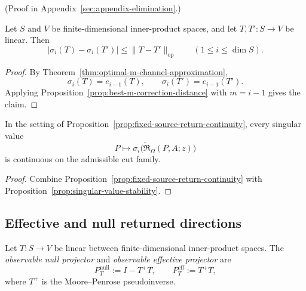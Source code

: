 (Proof in Appendix~\ref{sec:appendix-elimination}.)

\begin{proposition}
\label{prop:singular-value-stability}
Let \(S\) and \(V\) be finite-dimensional inner-product spaces, and let
\(T,T':S\to V\) be linear. Then
\[
\bigl|\sigma_i(T)-\sigma_i(T')\bigr|
\le
\|T-T'\|_{\mathrm{op}}
\qquad (1\le i\le \dim S).
\]
\end{proposition}

\begin{proof}
By Theorem~\ref{thm:optimal-m-channel-approximation},
\[
\sigma_i(T)=e_{i-1}(T),
\qquad
\sigma_i(T')=e_{i-1}(T').
\]
Applying Proposition~\ref{prop:best-m-correction-distance} with \(m=i-1\)
gives the claim.
\end{proof}

\begin{corollary}
\label{cor:workload-closure-spectrum-continuity}
In the setting of Proposition~\ref{prop:fixed-source-return-continuity}, every
singular value
\[
P\longmapsto \sigma_i\!\bigl(\widetilde{\mathfrak R}_{\Omega}(P,A;z)\bigr)
\]
is continuous on the admissible cut family.
\end{corollary}

\begin{proof}
Combine Proposition~\ref{prop:fixed-source-return-continuity} with
Proposition~\ref{prop:singular-value-stability}.
\end{proof}

\subsection{Effective and null returned directions}

\begin{definition}
\label{def:observable-null-effective-projectors}
Let \(T:S\to V\) be linear between finite-dimensional inner-product spaces. The
\emph{observable null projector} and \emph{observable effective projector} are
\[
P_T^{\mathrm{null}}:=I-T^+T,
\qquad
P_T^{\mathrm{eff}}:=T^+T,
\]
where \(T^+\) is the Moore--Penrose pseudoinverse.
\end{definition}

